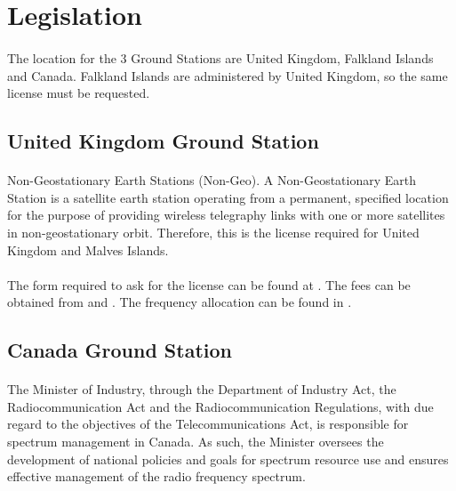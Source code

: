 \section{Legislation}

\paragraph{}The location for the 3 Ground Stations are United Kingdom, Falkland Islands and Canada. Falkland Islands are administered by United Kingdom, so the same license must be requested.

\subsection{United Kingdom Ground Station}

\paragraph{}Non-Geostationary Earth Stations (Non-Geo). A Non-Geostationary Earth Station is a satellite earth station operating from a permanent, specified location for the purpose of providing wireless telegraphy links with one or more satellites in non-geostationary orbit. Therefore, this is the license required for United Kingdom and Malves Islands.

\paragraph{}The form required to ask for the license can be found at \cite{UKForm}. The fees can be obtained from \cite{UKFees} and \cite{UKMHzFees}. The frequency allocation can be found in \cite{UKAllocation}.

\subsection{Canada Ground Station}

\paragraph{}The Minister of Industry, through the Department of Industry Act, the Radiocommunication Act and the Radiocommunication Regulations, with due regard to the objectives of the Telecommunications Act, is responsible for spectrum management in Canada. As such, the Minister oversees the development of national policies and goals for spectrum resource use and ensures effective management of the radio frequency spectrum.

